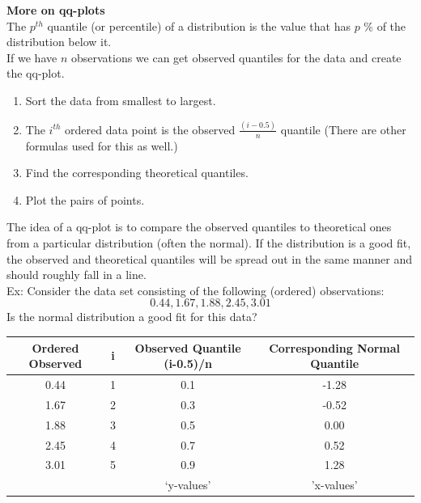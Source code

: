 \begin{enumerate}
\begin{itemize}
\begin{center}
\end{center}
\end{itemize}
\end{enumerate}

\textbf{More on qq-plots}\\
The $p^{th}$ quantile (or percentile) of a distribution is the value that has $p$ \% of the distribution below it.\\

If we have $n$ observations we can get observed quantiles for the data and create the qq-plot.
\begin{enumerate}
\item Sort the data from smallest to largest.
\item The $i^{th}$ ordered data point is the observed $\frac{(i-0.5)}{n}$ quantile
(There are other formulas used for this as well.)
\item Find the corresponding theoretical quantiles.
\item Plot the pairs of points.
\end{enumerate}

The idea of a qq-plot is to compare the observed quantiles to theoretical ones from a particular distribution (often the normal).  If the distribution is a good fit, the observed and theoretical quantiles will be spread out in the same manner and should roughly fall in a line.\\

Ex: Consider the data set consisting of the following (ordered) observations: 
$$0.44,	1.67,	1.88,	2.45,	3.01$$
Is the normal distribution a good fit for this data?\\

\begin{tabular}{cc|c|c}
Ordered Observed & i & Observed Quantile (i-0.5)/n & Corresponding Normal Quantile\\
\hline
0.44 & 1 & 0.1 & -1.28\\
1.67 & 2 & 0.3 & -0.52\\
1.88 & 3 & 0.5 & 0.00\\
2.45 & 4 & 0.7 & 0.52\\
3.01 & 5 & 0.9 & 1.28\\
 & & `y-values' & 'x-values'
\end{tabular}

